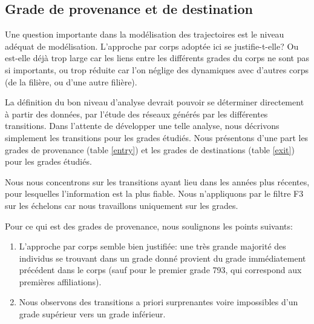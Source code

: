 \documentclass[11pt,a4paper]{article}
\begin{document}
\bigskip

\subsection{Grade de provenance et de destination}


Une question importante dans la modélisation des trajectoires est le niveau adéquat de modélisation. L'approche par corps adoptée ici se justifie-t-elle? Ou est-elle déjà trop large car les liens entre les différents grades du corps ne sont pas si importants, ou trop réduite car l'on néglige des dynamiques avec d'autres corps (de la filière, ou d'une autre filière). 

La définition du bon niveau d'analyse devrait pouvoir se déterminer directement à partir des données, par l'étude des réseaux générés par les différentes transitions. Dans l'attente de développer une telle analyse, nous décrivons simplement les transitions pour les grades étudiés. Nous présentons d'une part les grades de provenance (table \ref{entry}) et les grades de destinations (table \ref{exit}) pour les grades étudiés. 

Nous nous concentrons sur les transitions ayant lieu dans les années plus récentes, pour lesquelles l'information est la plus fiable. Nous n'appliquons par le filtre F3 sur les échelons car nous travaillons uniquement sur les grades. 

\bigskip

Pour ce qui est des grades de provenance, nous soulignons les points suivants: 
\begin{enumerate}[leftmargin=1cm ,parsep=0cm,itemsep=0cm,topsep=0cm] 
\item L'approche par corps semble bien justifiée: une très grande majorité des individus se trouvant dans un grade donné provient du grade immédiatement précédent dans le corps (sauf pour le premier grade 793, qui correspond aux premières affiliations).  
\item Nous observons des transitions a priori surprenantes voire impossibles d'un grade supérieur vers un grade inférieur.  
\end{enumerate}

\medskip
\end{document}
